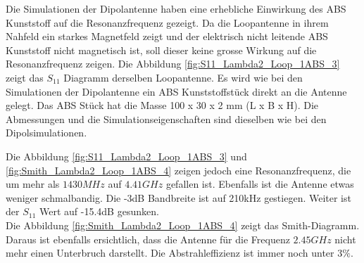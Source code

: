 Die Simulationen der Dipolantenne haben eine erhebliche Einwirkung des ABS Kunststoff auf die Resonanzfrequenz gezeigt. Da die Loopantenne in ihrem Nahfeld ein starkes Magnetfeld zeigt und der elektrisch nicht leitende ABS Kunststoff  nicht magnetisch ist, soll dieser keine grosse Wirkung auf die Resonanzfrequenz zeigen. 
Die Abbildung \ref{fig:S11_Lambda2_Loop_1ABS_3} zeigt das $S_{11}$ Diagramm derselben Loopantenne. Es wird wie bei den Simulationen der Dipolantenne ein ABS Kunststoffstück direkt an die Antenne gelegt. Das ABS Stück hat die Masse 100 x 30 x 2 mm (L x B x H). Die Abmessungen und die Simulationseigenschaften sind dieselben wie bei den Dipolsimulationen.

Die Abbildung \ref{fig:S11_Lambda2_Loop_1ABS_3} und \ref{fig:Smith_Lambda2_Loop_1ABS_4} zeigen jedoch eine Resonanzfrequenz, die um mehr als $1430MHz$ auf $4.41GHz$ gefallen ist. Ebenfalls ist die Antenne etwas weniger schmalbandig. Die -3dB Bandbreite ist auf 210kHz gestiegen. Weiter ist der $S_{11}$ Wert auf -15.4dB gesunken.\\Die Abbildung \ref{fig:Smith_Lambda2_Loop_1ABS_4} zeigt das Smith-Diagramm. Daraus ist ebenfalls ersichtlich, dass die Antenne für die Frequenz $2.45GHz$ nicht mehr einen Unterbruch darstellt. Die Abstrahleffizienz ist immer noch unter $3\%$.

